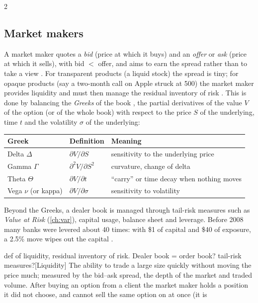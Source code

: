 \begin{paracol}{2}
\subsection{Market makers}
A market maker quotes a \emph{bid} (price at which it buys) and an \emph{offer} or \emph{ask}
(price at which it sells), with bid $<$ offer, and aims to earn the spread rather than to
take a view . For transparent products (a liquid stock) the spread is tiny;
for opaque products (say a two-month call on Apple struck at 500) the market maker provides
liquidity and must then manage the residual inventory of risk . This is done by
balancing the \emph{Greeks} of the book , the partial derivatives of the
value $V$ of the option (or of the whole book) with respect to the price $S$ of the underlying,
time $t$ and the volatility $\sigma$ of the underlying:
\begin{center}
\begin{tabular}{@{}lll@{}}
\toprule
Greek & Definition & Meaning\\
\midrule
Delta $\Delta$ & $\partial V/\partial S$ & sensitivity to the underlying price\\
Gamma $\Gamma$ & $\partial^2 V/\partial S^2$ & curvature, change of delta\\
Theta $\Theta$ & $\partial V/\partial t$ & ``carry'' or time decay when nothing moves\\
Vega $\nu$ (or kappa) & $\partial V/\partial \sigma$ & sensitivity to volatility\\
\bottomrule
\end{tabular}
\end{center}
Beyond the Greeks, a dealer book is managed through tail-risk measures such as
\emph{Value at Risk} (\cref{ch:var}), capital usage, balance sheet and leverage. Before 2008 many
banks were levered about 40 times: with \$1 of capital and \$40 of exposure, a 2.5\% move wipes
out the capital .
\begin{answer}{def of liquidity, residual inventory of risk. Dealer book = order book? tail-risk measures?}[Liquidity]
The ability to trade a large size quickly without moving the price much;
        measured by the bid--ask spread, the depth of the market and traded volume.
After buying an option from a client the market maker
        holds a position it did not choose, and cannot sell the same option on at once (it is

\end{answer}
\end{paracol}
